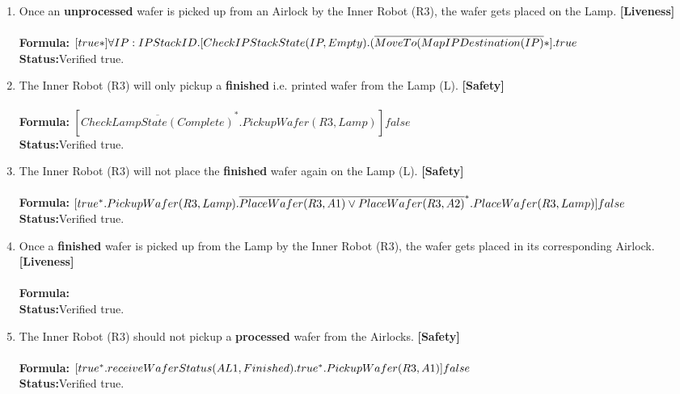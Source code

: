 \documentclass[a4paper,12pt]{article}
\begin{document}
\begin{enumerate}
		
		\item Once an \textbf{unprocessed} wafer is picked up from an Airlock by the Inner Robot (R3), the wafer gets placed on the Lamp. \textbf{[Liveness]}
		\\
		\\\textbf{Formula:} $[true*] \forall IP: IPStackID.[CheckIPStackState(IP, Empty).
		\\(\overline{MoveTo(MapIPDestination(IP)}*].true$ \\\textbf{Status:}Verified true.
		\item The Inner Robot (R3) will only pickup a \textbf{finished} i.e. printed wafer from the Lamp (L). \textbf{[Safety]}
		\\
		\\\textbf{Formula:} $[ \overline{CheckLampState(Complete)}^*.PickupWafer(R3,Lamp)]  false$ 
		\\\textbf{Status:}Verified true.
		\item The Inner Robot (R3) will not place the \textbf{finished} wafer again on the Lamp (L). \textbf{[Safety]}
		\\
		\\\textbf{Formula:} $[true^*.PickupWafer(R3,Lamp).
		\\ \overline{PlaceWafer(R3,A1) \vee PlaceWafer(R3,A2)}^*.PlaceWafer(R3,Lamp)] false$ \\\textbf{Status:}Verified true.
		\item Once a \textbf{finished} wafer is picked up from the Lamp by the Inner Robot (R3), the wafer gets placed in its corresponding Airlock. \textbf{[Liveness]}
		\\
		\\\textbf{Formula:} 
		\\\textbf{Status:}Verified true.
		\item The Inner Robot (R3) should not pickup a \textbf{processed} wafer from the Airlocks. \textbf{[Safety]}
		\\
		\\\textbf{Formula:} $[true^*. receiveWaferStatus(AL1, Finished). true^*. 
		\\PickupWafer(R3, A1)] false $
		\\\textbf{Status:}Verified true.

\end{enumerate}
\end{document}
